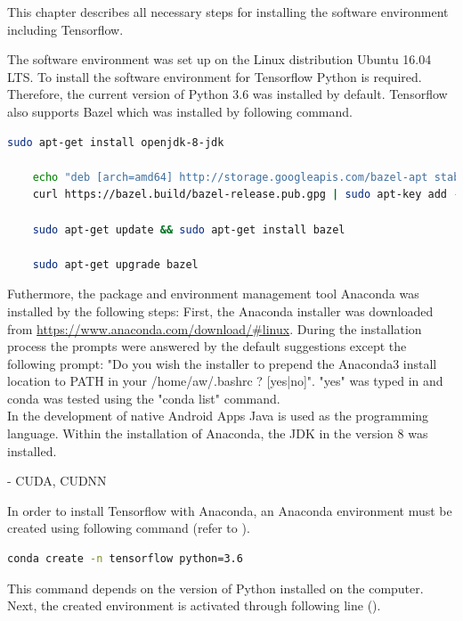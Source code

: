 This chapter describes all necessary steps for installing the software environment including Tensorflow.

The software environment was set up on the Linux distribution Ubuntu 16.04 LTS. To install the software environment for Tensorflow Python is required. Therefore, the current version of Python 3.6 was installed by default. Tensorflow also supports Bazel which was installed by following command.

\begin{lstlisting}[caption=Bazel Installation, label=list:bazel, language=bash]
	sudo apt-get install openjdk-8-jdk
	
	echo "deb [arch=amd64] http://storage.googleapis.com/bazel-apt stable jdk1.8" | sudo tee /etc/apt/				sources.list.d/bazel.list
	curl https://bazel.build/bazel-release.pub.gpg | sudo apt-key add -
	
	sudo apt-get update && sudo apt-get install bazel
	
	sudo apt-get upgrade bazel
\end{lstlisting}	

Futhermore, the package and environment management tool Anaconda was installed by the following steps:
First, the Anaconda installer was downloaded from \url{https://www.anaconda.com/download/#linux}. During the installation process the prompts were answered by the default suggestions except the following prompt: "Do you wish the installer to prepend the Anaconda3 install location to PATH in your /home/aw/.bashrc ? [yes|no]". "yes" was typed in and conda was tested using the "conda list" command. \\

In the development of native Android Apps Java is used as the programming language. Within the installation of Anaconda, the JDK in the version 8 was installed.

 	- CUDA, CUDNN
 	
In order to install Tensorflow with Anaconda, an Anaconda environment must be created using following command (refer to ).

\begin{lstlisting}[caption=Creating an Anaconda environment, label=list:tensorflow_anaconda, language=bash]
	conda create -n tensorflow python=3.6
\end{lstlisting}

This command depends on the version of Python installed on the computer. Next, the created environment is activated through following line ().

